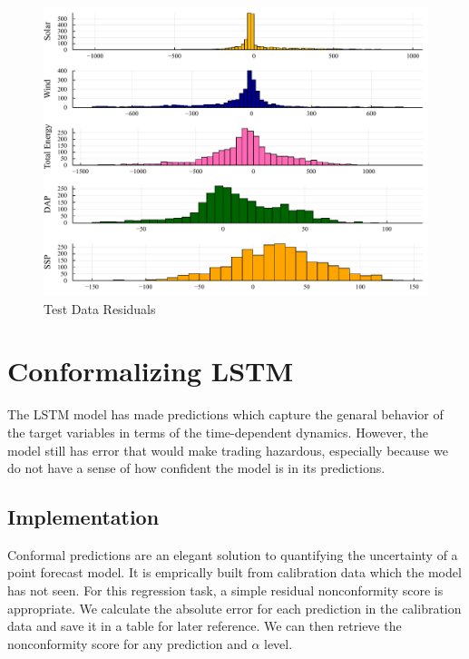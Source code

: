 \documentclass[
  journal,
]{IEEEtran}%
\begin{document}
\begin{figure}

{\centering \includegraphics{EnergyProdConformalLSTM_files/mediabag/EnergyProdConformalLSTM_files/figure-pdf/plot-residuals-output-1.pdf}

}

\caption{Test Data Residuals}

\end{figure}%

\section{Conformalizing LSTM}\label{conformalizing-lstm}

The LSTM model has made predictions which capture the genaral behavior
of the target variables in terms of the time-dependent dynamics.
However, the model still has error that would make trading hazardous,
especially because we do not have a sense of how confident the model is
in its predictions.

\subsection{Implementation}\label{implementation}

Conformal predictions are an elegant solution to quantifying the
uncertainty of a point forecast model. It is emprically built from
calibration data which the model has not seen. For this regression task,
a simple residual nonconformity score is appropriate. We calculate the
absolute error for each prediction in the calibration data and save it
in a table for later reference. We can then retrieve the nonconformity
score for any prediction and \(\alpha\) level.
\end{document}
